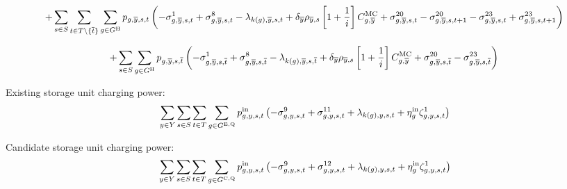\documentclass{article}
\begin{document}
\begin{equation}
+ \sum\limits_{\iScenario \in \sScenarios} \sum\limits_{\iInterval \in \sIntervals \setminus \{\iIntervalTerminal\}} \sum\limits_{\iGenerator \in \sGeneratorsHydro} \vPower[\iGenerator,\iYearTerminal,\iScenario,\iInterval] \left(-\dMinPowerOutput[\iGenerator,\iYearTerminal,\iScenario,\iInterval] + \dMaxPowerOutputHydro[\iGenerator,\iYearTerminal,\iScenario,\iInterval] - \dPowerBalance[k(\iGenerator),\iYearTerminal,\iScenario,\iInterval] + \cDiscountRate[\iYearTerminal] \cScenarioDuration[\iYearTerminal,\iScenario] \left[1 + \frac{1}{\cInterestRate}\right] \cMarginalCost[\iGenerator,\iYearTerminal] + \dRampRateUp[\iGenerator,\iYearTerminal,\iScenario,\iInterval] - \dRampRateUp[\iGenerator,\iYearTerminal,\iScenario,\iInterval + 1] - \dRampRateDown[\iGenerator,\iYearTerminal,\iScenario,\iInterval] + \dRampRateDown[\iGenerator,\iYearTerminal,\iScenario,\iInterval + 1]
\right)
\end{equation}

\begin{equation}
+ \sum\limits_{\iScenario \in \sScenarios} \sum\limits_{\iGenerator \in \sGeneratorsHydro} \vPower[\iGenerator,\iYearTerminal,\iScenario,\iIntervalTerminal] \left(-\dMinPowerOutput[\iGenerator,\iYearTerminal,\iScenario,\iIntervalTerminal] + \dMaxPowerOutputHydro[\iGenerator,\iYearTerminal,\iScenario,\iIntervalTerminal] - \dPowerBalance[k(\iGenerator),\iYearTerminal,\iScenario,\iIntervalTerminal] + \cDiscountRate[\iYearTerminal] \cScenarioDuration[\iYearTerminal,\iScenario] \left[1 + \frac{1}{\cInterestRate}\right] \cMarginalCost[\iGenerator,\iYearTerminal] + \dRampRateUp[\iGenerator,\iYearTerminal,\iScenario,\iIntervalTerminal] - \dRampRateDown[\iGenerator,\iYearTerminal,\iScenario,\iIntervalTerminal]
\right)
\end{equation}

Existing storage unit charging power:
\begin{align}
	& \sum\limits_{\iYear \in \sYears} \sum\limits_{\iScenario \in \sScenarios} \sum\limits_{\iInterval \in \sIntervals 
	} \sum\limits_{\iGenerator \in \sStorageExisting} \vPowerIn \left( - \dNonNegativeCharging + \dMaxChargingRateExisting + \dPowerBalance[k(\iGenerator),\iYear,\iScenario,\iInterval] + \cStorageUnitEfficiencyCharging\dStorageEnergyTransition 
	 \right) \nonumber\\
\end{align}

Candidate storage unit charging power:
\begin{align}
	& \sum\limits_{\iYear \in \sYears} \sum\limits_{\iScenario \in \sScenarios} \sum\limits_{\iInterval \in \sIntervals 
	} \sum\limits_{\iGenerator \in \sStorageCandidate} \vPowerIn \left( - \dNonNegativeCharging + \dMaxChargingRateCandidate + \dPowerBalance[k(\iGenerator),\iYear,\iScenario,\iInterval] + \cStorageUnitEfficiencyCharging\dStorageEnergyTransition
	\right)\nonumber\\
\end{align}
\end{document}
